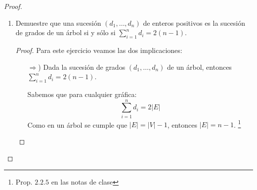 \documentclass{article}
\begin{document}
\begin{enumerate}
\begin{proof}
\begin{enumerate}
      \begin{proof} Demostración por inducción sobre m

        Paso base (m=1)

        Por definición de hidrocarburo saturado $C_1 k_4 \Longrightarrow$  4 = 2(1)+2 por lo tanto para m=1 se cumple que n=2m+2

        Hipótesis de inducción m = k, si  $C_k H_n \Longrightarrow$ supongamos n=2k+2

        Paso Inductivo

        Pd m=k+1

        Por hipótesis de inducción tenemos que $C_k H_n \Longrightarrow$ n=2k+2 y por paso base $c_1 K_4 \Longrightarrow$ 4=2(1)+2 $\Longrightarrow$ sean r que pertenece a los Naturales sin el 0, sea $C_r$ y $C_1$ donde  $C_r$ pertenece a $C_k H_n$  y $C_1$ pertenece a $C_1 k_4$ tal que r pertenece a ${1,2,3,...,k}$  $\Longrightarrow$  eliminemos 1 hidrógeno a $C_r$ y $C_1 \Longrightarrow C_k H_{n-1}$ y $C_1 k_3$ son iguales a n-1=2k+1 ...(1) y 3=2(1)+1 ...(2) $\Longrightarrow$ uniendo $C_k H_{n-1}$ y $C_1 k_3$ mediante los vertices $C_r$ y $C_1$ $\Longrightarrow C_{k+1} H_{m}$ seria igual a la suma de (1) y (2) $\Longrightarrow$ n+2 = 2(k) + 2(1) +2 $\Longrightarrow$  n+2 = 2(k+1)+2
        $\Longrightarrow$ m=n+1 $\Longrightarrow$  n+2 = 2(k+1)+2. Por lo tanto para $C_{k+1} H_{m}$ m=2(k+1)+2

        Por lo tanto,  para todo m que pertenece a Naturales sin el cero $C_m H_n$ tal que n=2m+2


      \end{proof}

    \item Demuestre que una sucesi\'on $(d_1, \dots,
      d_n)$ de enteros positivos es la sucesi\'on de
      grados de un \'arbol si y s\'olo si
      $\sum_{i=1}^n d_i = 2(n-1)$.

      \renewcommand\qedsymbol{QED}
      \begin{proof}
        Para este ejercicio veamos las dos implicaciones:
        \begin{itemize}
          \item[$\Rightarrow$)] Dada la sucesi\'on de grados $(d_1, \dots, d_n)$ de un
            \'arbol, entonces $\displaystyle \sum_{i=1}^n d_i = 2(n-1)$.

            Sabemos que para cualquier gr\'afica:
            \[
            \sum_{i=1}^n d_i = 2|E|
            \]
            Como en un \'arbol se cumple que $|E| = |V| - 1$, entonces $|E| = n - 1$. \footnote{Prop. $2.2.5$ en las
            notas de clase}


\end{itemize}
\end{proof}
\end{enumerate}
\end{proof}
\end{enumerate}
\end{document}
